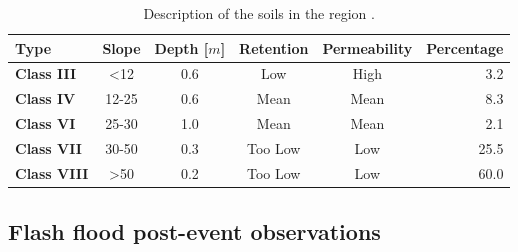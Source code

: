 \documentclass[hess, manuscript]{copernicus}
\begin{document}
\begin{table}[t]
  \caption{Description of the soils in the region \citep{Osorio2008}.}
  \begin{tabular}{lccccr}
  \hline
    \textbf{Type} & \textbf{Slope} & \textbf{Depth [$m$]} & \textbf{Retention} & \textbf{Permeability} & \textbf{Percentage} \\    
  \hline
    \textbf{Class III} & <12 & 0.6 & Low & High &  3.2\\
    \textbf{Class IV} & 12-25 & 0.6 & Mean & Mean & 8.3\\
    \textbf{Class VI} & 25-30 & 1.0 & Mean & Mean & 2.1\\
    \textbf{Class VII} & 30-50 & 0.3 & Too Low & Low & 25.5\\
    \textbf{Class VIII} & >50 & 0.2 & Too Low & Low & 60.0\\
  \hline
  \end{tabular}
  \label{tab:suelos}
\end{table}

\subsection{Flash flood post-event observations}
\end{document}
